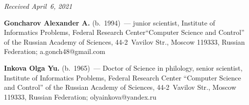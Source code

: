 \vspace*{-3pt}

  \hfill{\small\textit{Received April~6, 2021}}




\Contr

\noindent
\textbf{Goncharov Alexander A.} (b.\ 1994)~--- junior scientist, Institute of Informatics 
Problems, Federal Research Center``Computer Science and Control'' of the Russian Academy of 
Sciences, 44-2~Vavilov Str., Moscow 119333, Russian Federation; 
\mbox{a.gonch48@gmail.com}

\vspace*{6pt}

\noindent
\textbf{Inkova Olga Yu.} (b.\ 1965)~--- Doctor of Science  in philology, senior scientist, 
Institute of Informatics Problems, Federal Research Center ``Computer Science and Control'' of 
the Russian Academy of Sciences, 44-2~Vavilov Str., Moscow 119333, Russian Federation; 
\mbox{olyainkova@yandex.ru}

\label{end\stat}

\renewcommand{\bibname}{\protect\rm Литература}